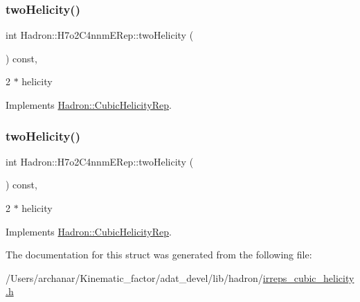\subsubsection{\texorpdfstring{twoHelicity()}{twoHelicity()}\hspace{0.1cm}{\footnotesize\ttfamily [1/2]}}
{\footnotesize\ttfamily int Hadron\+::\+H7o2\+C4nnm\+E\+Rep\+::two\+Helicity (\begin{DoxyParamCaption}{ }\end{DoxyParamCaption}) const\hspace{0.3cm}{\ttfamily [inline]}, {\ttfamily [virtual]}}

2 $\ast$ helicity 

Implements \mbox{\hyperlink{structHadron_1_1CubicHelicityRep_af507aa56fc2747eacc8cb6c96db31ecc}{Hadron\+::\+Cubic\+Helicity\+Rep}}.

\mbox{\label{structHadron_1_1H7o2C4nnmERep_a31bbba3df84a0943bb90635b1c99e5f0}} 
\subsubsection{\texorpdfstring{twoHelicity()}{twoHelicity()}\hspace{0.1cm}{\footnotesize\ttfamily [2/2]}}
{\footnotesize\ttfamily int Hadron\+::\+H7o2\+C4nnm\+E\+Rep\+::two\+Helicity (\begin{DoxyParamCaption}{ }\end{DoxyParamCaption}) const\hspace{0.3cm}{\ttfamily [inline]}, {\ttfamily [virtual]}}

2 $\ast$ helicity 

Implements \mbox{\hyperlink{structHadron_1_1CubicHelicityRep_af507aa56fc2747eacc8cb6c96db31ecc}{Hadron\+::\+Cubic\+Helicity\+Rep}}.



The documentation for this struct was generated from the following file\+:\begin{DoxyCompactItemize}
\item 
/\+Users/archanar/\+Kinematic\+\_\+factor/adat\+\_\+devel/lib/hadron/\mbox{\hyperlink{lib_2hadron_2irreps__cubic__helicity_8h}{irreps\+\_\+cubic\+\_\+helicity.\+h}}\end{DoxyCompactItemize}

